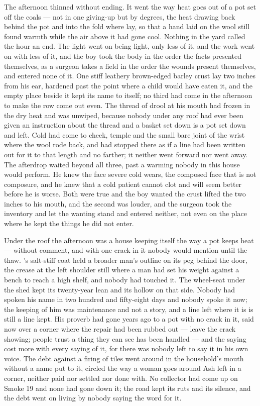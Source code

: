 The afternoon thinned without ending. It went the way heat goes out of a pot set off the coals --- not in one giving-up but by degrees, the heat drawing back behind the pot and into the fold where  lay, so that a hand laid on the wool still found warmth while the air above it had gone cool. Nothing in the yard called the hour an end. The light went on being light, only less of it, and the work went on with less of it, and the boy took the body in the order the facts presented themselves, as a surgeon takes a field in the order the wounds present themselves, and entered none of it. One stiff leathery brown-edged barley crust lay two inches from his ear, hardened past the point where a child would have eaten it, and the empty place beside it kept its name to itself; no third had come in the afternoon to make the row come out even. The thread of drool at his mouth had frozen in the dry heat and was unwiped, because nobody under any roof had ever been given an instruction about the thread and a basket set down is a pot set down and left. Cold had come to cheek, temple and the small bare joint of the wrist where the wool rode back, and had stopped there as if a line had been written out for it to that length and no farther; it neither went forward nor went away. The afterdrop waited beyond all three, past a warming nobody in this house would perform. He knew the face severe cold wears, the composed face that is not composure, and he knew that a cold patient cannot clot and will seem better before he is worse. Both were true and the boy wanted the crust lifted the two inches to his mouth, and the second was louder, and the surgeon took the inventory and let the wanting stand and entered neither, not even on the place where he kept the things he did not enter.

Under the roof the afternoon was a house keeping itself the way a pot keeps heat --- without comment, and with one crack in it nobody would mention until the thaw. 's salt-stiff coat held a broader man's outline on its peg behind the door, the crease at the left shoulder still where a man had set his weight against a bench to reach a high shelf, and nobody had touched it. The wheel-seat under the shed kept its twenty-year lean and its hollow on that side. Nobody had spoken his name in two hundred and fifty-eight days and nobody spoke it now; the keeping of him was maintenance and not a story, and a line left where it is is still a line kept. His proverb had gone years ago to a pot with no crack in it, said now over a corner where the repair had been rubbed out --- leave the crack showing; people trust a thing they can see has been handled --- and the saying cost more with every saying of it, for there was nobody left to say it in his own voice. The debt against a firing of tiles went around in the household's mouth without a name put to it, circled the way a woman goes around Ash left in a corner, neither paid nor settled nor done with. No collector had come up  on Smoke 19 and none had gone down it; the road kept its ruts and its silence, and the debt went on living by nobody saying the word for it.

